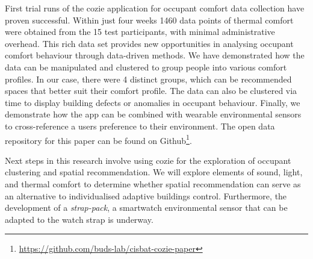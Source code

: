 
First trial runs of the cozie application for occupant comfort data collection have proven successful. Within just four weeks 1460 data points of thermal comfort were obtained from the 15 test participants, with minimal administrative overhead. This rich data set provides new opportunities in analysing occupant comfort behaviour through data-driven methods. We have demonstrated how the data can be manipulated and clustered to group people into various comfort profiles. In our case, there were 4 distinct groups, which can be recommended spaces that better suit their comfort profile. The data can also be clustered via time to display building defects or anomalies in occupant behaviour. Finally, we demonstrate how the app can be combined with wearable environmental sensors to cross-reference a users preference to their environment. The open data repository for this paper can be found on Github\footnote{\url{https://github.com/buds-lab/cisbat-cozie-paper}}.

Next steps in this research involve using cozie for the exploration of occupant clustering and spatial recommendation. We will explore elements of sound, light, and thermal comfort to determine whether spatial recommendation can serve as an alternative to individualised adaptive buildings control. Furthermore, the development of a \emph{strap-pack}, a smartwatch environmental sensor that can be adapted to the watch strap is underway. 